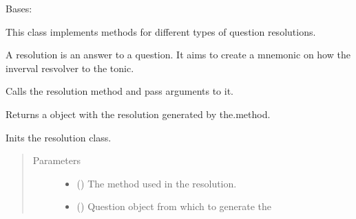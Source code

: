 \documentclass[letterpaper,10pt,english]{sphinxmanual}
\begin{document}
\begin{fulllineitems}
\label{\detokenize{index:birdears.resolution.Resolution}}
\sphinxAtStartPar
Bases: 

\sphinxAtStartPar
This class implements methods for different types of question
resolutions.

\sphinxAtStartPar
A resolution is an answer to a question. It aims to create a mnemonic on
how the inverval resvolver to the tonic.

\begin{fulllineitems}
\label{\detokenize{index:birdears.resolution.Resolution.__call__}}
\sphinxAtStartPar
Calls the resolution method and pass arguments to it.

\sphinxAtStartPar
Returns a  object with the resolution generated by
the.method.

\end{fulllineitems}


\begin{fulllineitems}
\label{\detokenize{index:birdears.resolution.Resolution.__init__}}
\sphinxAtStartPar
Inits the resolution class.
\begin{quote}\begin{description}
\item[{Parameters}] \leavevmode\begin{itemize}
\item {} 
\sphinxAtStartPar
{} () \textendash{} The method used in the resolution.

\item {} 
\sphinxAtStartPar
{} () \textendash{} Question object from which to generate the


\end{itemize}
\end{description}
\end{quote}
\end{fulllineitems}
\end{fulllineitems}
\end{document}

